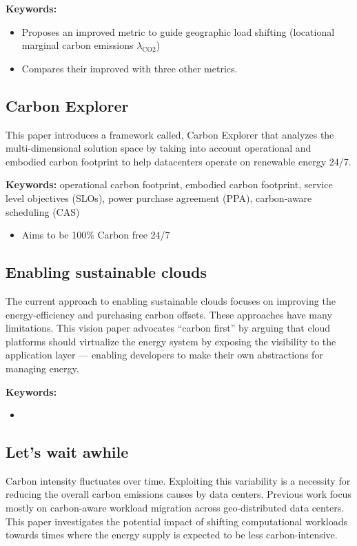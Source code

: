 \textbf{Keywords: }

\begin{itemize}
    \item Proposes an improved metric to guide geographic load shifting (locational marginal carbon emissions $\lambda_\text{CO2}$)
    \item Compares their improved with three other metrics.
\end{itemize}

\subsection{Carbon Explorer \cite{acunCarbonExplorerHolistic2022}}
This paper introduces a framework called, Carbon Explorer that analyzes the multi-dimensional solution space by taking into account operational and embodied carbon footprint to help datacenters operate on renewable energy 24/7.

\textbf{Keywords: }operational carbon footprint, embodied carbon footprint, service level objectives (SLOs), power purchase agreement (PPA), carbon-aware scheduling (CAS)

\begin{itemize}
    \item Aims to be 100\% Carbon free 24/7
\end{itemize}

\subsection{Enabling sustainable clouds \cite{bashirEnablingSustainableClouds2021}}
The current approach to enabling sustainable clouds focuses on improving the energy-efficiency and purchasing carbon offsets. These approaches have many limitations. This vision paper advocates ``carbon first'' by arguing that cloud platforms should virtualize the energy system by exposing the visibility to the application layer --- enabling developers to make their own abstractions for managing energy.

\textbf{Keywords: } 

\begin{itemize}
    \item 
\end{itemize}

\subsection{Let's wait awhile \cite{wiesnerLetWaitAwhile2021}}
Carbon intensity fluctuates over time. Exploiting this variability is a necessity for reducing the overall carbon emissions causes by data centers. Previous work focus mostly on carbon-aware workload migration across geo-distributed data centers. This paper investigates the potential impact of shifting computational workloads towards times where the energy supply is expected to be less carbon-intensive.